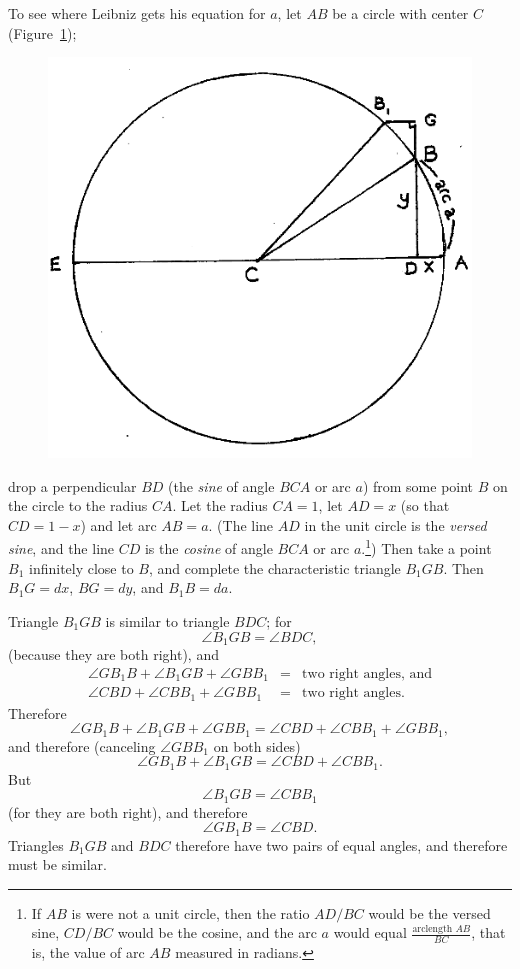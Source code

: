 \documentclass[polutonikogreek,english,twoside,openright]{article}
\begin{document}
To see where Leibniz gets his equation for $a$, let $AB$ be a circle with center $C$ (Figure~\ref{circarc});
\begin{figure}[htp]
\begin{center}
\includegraphics[width=.65\textwidth]{fig/Figure42}
\caption{}
\label{circarc}
\vspace{-10pt}
\end{center}
\end{figure} 
drop a perpendicular $BD$ (the {\em sine} of angle $BCA$ or arc
$a$) from some point $B$ on the circle to the radius $CA$.  Let the
radius $CA=1$, let $AD = x$ (so that $CD = 1-x$) and let arc $AB = a$.
(The line $AD$ in the unit circle is the {\em versed sine}, and the
line $CD$ is the {\em cosine} of angle $BCA$ or arc $a$.\footnote{If
  $AB$ is were not a unit circle, then the ratio $AD/BC$ would be the
  versed sine, $CD/BC$ would be the cosine, and the arc $a$ would
  equal $\displaystyle \frac{\text{arclength }AB}{BC}$, that is, the
  value of arc $AB$ measured in radians.}) Then take a point $B_1$
infinitely close to $B$, and complete the characteristic triangle
$B_1GB$.  Then $B_1G=dx$,\label{b1gpositive} $BG = dy$, and
$B_1B = da$.

Triangle $B_1GB$ is similar to triangle $BDC$; for 
$$\angle B_1GB = \angle BDC,$$
(because they are both right), and
\begin{eqnarray*}
\angle GB_1B + \angle B_1GB + \angle GBB_1 & = & \mbox{two right angles, and}\\
\angle CBD + \angle CBB_1 + \angle GBB_1 & = & \mbox{two right angles.}
\end{eqnarray*}
Therefore 
$$\angle GB_1B + \angle B_1GB + \angle GBB_1 = \angle CBD + \angle CBB_1 + \angle GBB_1, $$
and therefore (canceling $\angle GBB_1$ on both sides)
$$\angle GB_1B + \angle B_1GB  = \angle CBD + \angle CBB_1. $$
But 
$$\angle B_1GB = \angle CBB_1$$
(for they are both right), and therefore
$$\angle GB_1B = \angle CBD.$$
Triangles $B_1GB$ and $BDC$ therefore have two pairs of equal angles, and therefore must be similar.
\end{document}
